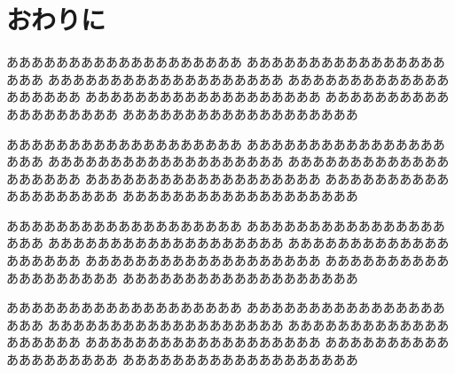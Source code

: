 \section{おわりに}
あああああああああああああああああああ
あああああああああああああああああああ
あああああああああああああああああああ
あああああああああああああああああああ
あああああああああああああああああああ
あああああああああああああああああああ
あああああああああああああああああああ

あああああああああああああああああああ
あああああああああああああああああああ
あああああああああああああああああああ
あああああああああああああああああああ
あああああああああああああああああああ
あああああああああああああああああああ
あああああああああああああああああああ

あああああああああああああああああああ
あああああああああああああああああああ
あああああああああああああああああああ
あああああああああああああああああああ
あああああああああああああああああああ
あああああああああああああああああああ
あああああああああああああああああああ

あああああああああああああああああああ
あああああああああああああああああああ
あああああああああああああああああああ
あああああああああああああああああああ
あああああああああああああああああああ
あああああああああああああああああああ
あああああああああああああああああああ
